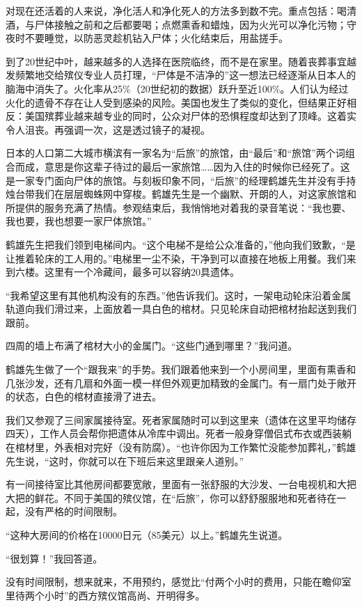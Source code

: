 \documentclass[12pt,oneside]{book}
\begin{document}
\begin{bookref}[frametitle={\cite{好好告别：世界葬礼观察手记}}]
对现在还活着的人来说，净化活人和净化死人的方法多到数不完。重点包括：喝清酒，与尸体接触之前和之后都要喝；点燃熏香和蜡烛，因为火光可以净化污物；守夜时不要睡觉，以防恶灵趁机钻入尸体；火化结束后，用盐搓手。

到了20世纪中叶，越来越多的人选择在医院临终，而不是在家里。随着丧葬事宜越发频繁地交给殡仪专业人员打理，“尸体是不洁净的”这一想法已经逐渐从日本人的脑海中消失了。火化率从25\%（20世纪初的数据）跃升至近100\%。人们认为经过火化的遗骨不存在让人受到感染的风险。美国也发生了类似的变化，但结果正好相反：美国殡葬业越来越专业的同时，公众对尸体的恐惧程度却达到了顶峰。这着实令人沮丧。再强调一次，这是透过镜子的凝视。

日本的人口第二大城市横滨有一家名为“后旅”的旅馆，由“最后”和“旅馆”两个词组合而成，意思是你这辈子待过的最后一家旅馆……因为入住的时候你已经死了。这是一家专门面向尸体的旅馆。与刻板印象不同，“后旅”的经理鹤雄先生并没有手持烛台带我们在层层蜘蛛网中穿梭。鹤雄先生是一个幽默、开朗的人，对这家旅馆和所提供的服务充满了热情。参观结束后，我悄悄地对着我的录音笔说：“我也要、我也要，我也想要一家尸体旅馆。”

鹤雄先生把我们领到电梯间内。“这个电梯不是给公众准备的，”他向我们致歉，“是让推着轮床的工人用的。”电梯里一尘不染，干净到可以直接在地板上用餐。我们来到六楼。这里有一个冷藏间，最多可以容纳20具遗体。

“我希望这里有其他机构没有的东西。”他告诉我们。这时，一架电动轮床沿着金属轨道向我们滑过来，上面放着一具白色的棺材。只见轮床自动把棺材抬起送到我们跟前。

四周的墙上布满了棺材大小的金属门。“这些门通到哪里？”我问道。

鹤雄先生做了一个“跟我来”的手势。我们跟着他来到一个小房间里，里面有熏香和几张沙发，还有几扇和外面一模一样但外观更加精致的金属门。有一扇门处于敞开的状态，白色的棺材直接滑了进去。

我们又参观了三间家属接待室。死者家属随时可以到这里来（遗体在这里平均储存四天），工作人员会帮你把遗体从冷库中调出。死者一般身穿僧侣式布衣或西装躺在棺材里，外表相对完好（没有防腐）。“也许你因为工作繁忙没能参加葬礼，”鹤雄先生说，“这时，你就可以在下班后来这里跟亲人道别。”

有一间接待室比其他房间都要宽敞，里面有一张舒服的大沙发、一台电视机和大把大把的鲜花。不同于美国的殡仪馆，在“后旅”，你可以舒舒服服地和死者待在一起，没有严格的时间限制。

“这种大房间的价格在10000日元（85美元）以上。”鹤雄先生说道。

“很划算！”我回答道。

没有时间限制，想来就来，不用预约，感觉比“付两个小时的费用，只能在瞻仰室里待两个小时”的西方殡仪馆高尚、开明得多。


\end{bookref}
\end{document}
